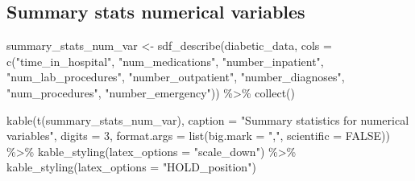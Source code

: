 \documentclass[
]{article}
\newenvironment{Shaded}{\begin{snugshade}}{\end{snugshade}}
\newcommand{\AttributeTok}[1]{\textcolor[rgb]{0.77,0.63,0.00}{#1}}
\newcommand{\ConstantTok}[1]{\textcolor[rgb]{0.00,0.00,0.00}{#1}}
\newcommand{\DecValTok}[1]{\textcolor[rgb]{0.00,0.00,0.81}{#1}}
\newcommand{\FunctionTok}[1]{\textcolor[rgb]{0.00,0.00,0.00}{#1}}
\newcommand{\NormalTok}[1]{#1}
\newcommand{\OtherTok}[1]{\textcolor[rgb]{0.56,0.35,0.01}{#1}}
\newcommand{\SpecialCharTok}[1]{\textcolor[rgb]{0.00,0.00,0.00}{#1}}
\newcommand{\StringTok}[1]{\textcolor[rgb]{0.31,0.60,0.02}{#1}}
\begin{document}
\hypertarget{summary-stats-numerical-variables}{%
\subsection{Summary stats numerical
variables}\label{summary-stats-numerical-variables}}

\begin{Shaded}
\begin{Highlighting}[]
\NormalTok{summary\_stats\_num\_var }\OtherTok{\textless{}{-}} \FunctionTok{sdf\_describe}\NormalTok{(diabetic\_data,}
    \AttributeTok{cols =} \FunctionTok{c}\NormalTok{(}\StringTok{"time\_in\_hospital"}\NormalTok{, }\StringTok{"num\_medications"}\NormalTok{,}
        \StringTok{"number\_inpatient"}\NormalTok{, }\StringTok{"num\_lab\_procedures"}\NormalTok{, }\StringTok{"number\_outpatient"}\NormalTok{,}
        \StringTok{"number\_diagnoses"}\NormalTok{, }\StringTok{"num\_procedures"}\NormalTok{, }\StringTok{"number\_emergency"}\NormalTok{)) }\SpecialCharTok{\%\textgreater{}\%}
    \FunctionTok{collect}\NormalTok{()}

\FunctionTok{kable}\NormalTok{(}\FunctionTok{t}\NormalTok{(summary\_stats\_num\_var), }\AttributeTok{caption =} \StringTok{"Summary statistics for numerical variables"}\NormalTok{,}
    \AttributeTok{digits =} \DecValTok{3}\NormalTok{, }\AttributeTok{format.args =} \FunctionTok{list}\NormalTok{(}\AttributeTok{big.mark =} \StringTok{","}\NormalTok{,}
        \AttributeTok{scientific =} \ConstantTok{FALSE}\NormalTok{)) }\SpecialCharTok{\%\textgreater{}\%}
    \FunctionTok{kable\_styling}\NormalTok{(}\AttributeTok{latex\_options =} \StringTok{"scale\_down"}\NormalTok{) }\SpecialCharTok{\%\textgreater{}\%}
    \FunctionTok{kable\_styling}\NormalTok{(}\AttributeTok{latex\_options =} \StringTok{"HOLD\_position"}\NormalTok{)}
\end{Highlighting}
\end{Shaded}
\end{document}
